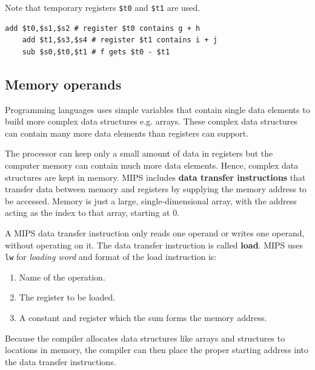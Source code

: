 \documentclass[10pt,a4paper]{article}
\begin{document}
Note that temporary registers \texttt{\$t0} and \texttt{\$t1} are used.
\begin{lstlisting}[numbers=none]
    add $t0,$s1,$s2 # register $t0 contains g + h
    add $t1,$s3,$s4 # register $t1 contains i + j
    sub $s0,$t0,$t1 # f gets $t0 - $t1
\end{lstlisting}

\subsection{Memory operands}

Programming languages uses simple variables that contain single data elements to build more complex
data structures e.g. arrays. These complex data structures can contain many more data elements 
than registers can support.

The processor can keep only a small amount of data in registers but the computer memory can contain
much more data elements. Hence, complex data structures are kept in memory. MIPS includes \textbf{data
transfer instructions} that transfer data between memory and registers by supplying the memory
address to be accessed. Memory is just a large, single-dimensional array, with the address acting as the 
index to that array, starting at 0.

A MIPS data transfer instruction only reads one operand or writes one operand, without operating on
it. The data transfer instruction is called \textbf{load}. MIPS uses \texttt{lw} for \textit{loading
word} and format of the load instruction is:
\begin{enumerate}
    \item Name of the operation.
    \item The register to be loaded.
    \item A constant and register which the sum forms the memory address.
\end{enumerate} 

Because the compiler allocates data structures like arrays and structures to locations in memory, the compiler can then place the proper starting address into the data transfer instructions.
\end{document}
